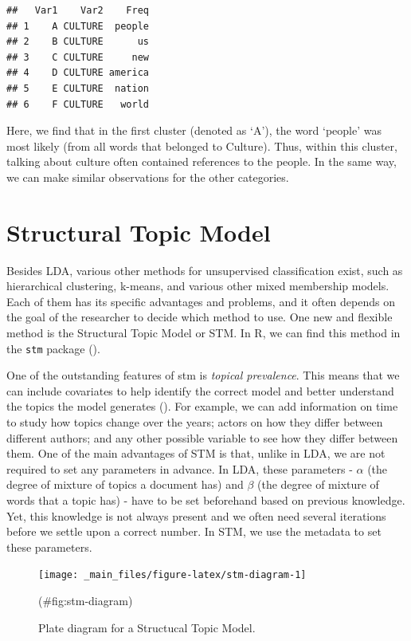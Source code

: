 \documentclass[
]{book}
\begin{document}
\begin{verbatim}
##   Var1    Var2    Freq
## 1    A CULTURE  people
## 2    B CULTURE      us
## 3    C CULTURE     new
## 4    D CULTURE america
## 5    E CULTURE  nation
## 6    F CULTURE   world
\end{verbatim}

Here, we find that in the first cluster (denoted as `A'), the word `people' was most likely (from all words that belonged to Culture). Thus, within this cluster, talking about culture often contained references to the people. In the same way, we can make similar observations for the other categories.

\section{Structural Topic Model}\label{structural-topic-model}

Besides LDA, various other methods for unsupervised classification exist, such as hierarchical clustering, k-means, and various other mixed membership models. Each of them has its specific advantages and problems, and it often depends on the goal of the researcher to decide which method to use. One new and flexible method is the Structural Topic Model or STM. In R, we can find this method in the \texttt{stm} package ().

One of the outstanding features of stm is \emph{topical prevalence}. This means that we can include covariates to help identify the correct model and better understand the topics the model generates (). For example, we can add information on time to study how topics change over the years; actors on how they differ between different authors; and any other possible variable to see how they differ between them. One of the main advantages of STM is that, unlike in LDA, we are not required to set any parameters in advance. In LDA, these parameters - \(\alpha\) (the degree of mixture of topics a document has) and \(\beta\) (the degree of mixture of words that a topic has) - have to be set beforehand based on previous knowledge. Yet, this knowledge is not always present and we often need several iterations before we settle upon a correct number. In STM, we use the metadata to set these parameters.

\hfill\break

\begin{figure}
\texttt{[image: \_main\_files/figure-latex/stm-diagram-1]} \caption{Plate diagram for a Structucal Topic Model.}(\#fig:stm-diagram)
\end{figure}
\end{document}
